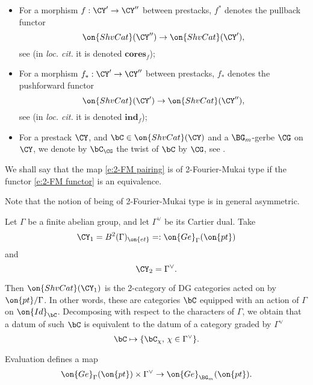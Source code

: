\documentclass[9pt]{amsart}
\theoremstyle{remark}
\theoremstyle{definition}
\theoremstyle{remark}
\numberwithin{equation}{section}
\begin{document}
\begin{itemize}

\item For a morphism $f:\CY'\to \CY''$ between prestacks, $f^*$ denotes the pullback functor
$$\on{ShvCat}(\CY'')\to \on{ShvCat}(\CY'),$$
see \cite[Sect. 3.1.2]{Ga3} (in {\it loc. cit.} it is denoted ${\mathbf{cores}}_f$); 

\medskip

\item For a morphism $f_*:\CY'\to \CY''$ between prestacks, $f_*$ denotes the pushforward functor
$$\on{ShvCat}(\CY')\to \on{ShvCat}(\CY''),$$
see \cite[Sect. 3.1.3]{Ga3} (in {\it loc. cit.} it is denoted ${\mathbf{ind}}_f$); 

\medskip

\item For a prestack $\CY$, and $\bC\in \on{ShvCat}(\CY)$ and a $\BG_m$-gerbe $\CG$ on $\CY$,
we denote by $\bC_\CG$ the twist of $\bC$ by $\CG$, see \cite[Sect. 1.7.2]{GLys}. 

\end{itemize} 

\medskip

We shall say that the map \eqref{e:2-FM pairing} is of 2-Fourier-Mukai type if the functor \eqref{e:2-FM functor}
is an equivalence.

\medskip

\noindent Note that the notion of being of 2-Fourier-Mukai type is in general 
asymmetric. 

 \label{sss:Ge finite}

Let $\Gamma$ be a finite abelian group, and let $\Gamma^\vee$ be its Cartier dual. Take
$$\CY_1=B^2(\Gamma)_{\on{et}}=:\on{Ge}_{\Gamma}(\on{pt})$$
and 
$$\CY_2=\Gamma^\vee.$$

Then $\on{ShvCat}(\CY_1)$ is the 2-category of DG categories acted on by $\on{pt}/\Gamma$.
In other words, these are categories $\bC$ equipped with an action of $\Gamma$ on $\on{Id}_\bC$.
Decomposing with respect to the characters of $\Gamma$, we obtain that a datum of such $\bC$ is 
equivalent to the datum of a category graded by $\Gamma^\vee$
\begin{equation} \label{e:2-FM functor finite group}
\bC\mapsto \{\bC_\chi,\, \chi\in \Gamma^\vee\}.
\end{equation} 

\medskip

Evaluation defines a map
\begin{equation} \label{e:2-FM pairing finite group}
\on{Ge}_{\Gamma}(\on{pt})\times \Gamma^\vee\to \on{Ge}_{\BG_m}(\on{pt}).
\end{equation}
\end{document}
